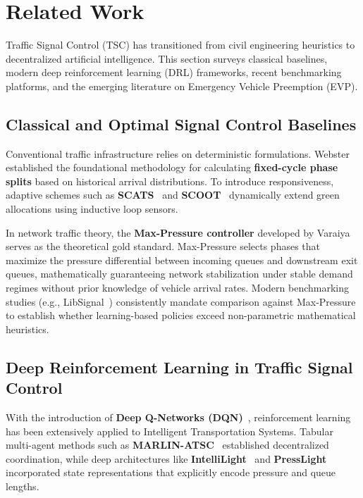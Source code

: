 \section{Related Work}
\label{sec:related_work}

Traffic Signal Control (TSC) has transitioned from civil engineering heuristics to decentralized artificial intelligence. This section surveys classical baselines, modern deep reinforcement learning (DRL) frameworks, recent benchmarking platforms, and the emerging literature on Emergency Vehicle Preemption (EVP).

\subsection{Classical and Optimal Signal Control Baselines}
Conventional traffic infrastructure relies on deterministic formulations. Webster~\cite{webster1958} established the foundational methodology for calculating \textbf{fixed-cycle phase splits} based on historical arrival distributions. To introduce responsiveness, adaptive schemes such as \textbf{SCATS}~\cite{lowrie1990scats} and \textbf{SCOOT}~\cite{hunt1981scoot} dynamically extend green allocations using inductive loop sensors.

In network traffic theory, the \textbf{Max-Pressure controller} developed by Varaiya~\cite{varaiya2013maxpressure} serves as the theoretical gold standard. Max-Pressure selects phases that maximize the pressure differential between incoming queues and downstream exit queues, mathematically guaranteeing network stabilization under stable demand regimes without prior knowledge of vehicle arrival rates. Modern benchmarking studies (e.g., LibSignal~\cite{mei2022libsignal}) consistently mandate comparison against Max-Pressure to establish whether learning-based policies exceed non-parametric mathematical heuristics.

\subsection{Deep Reinforcement Learning in Traffic Signal Control}
With the introduction of \textbf{Deep Q-Networks (DQN)}~\cite{mnih2015human}, reinforcement learning has been extensively applied to Intelligent Transportation Systems. Tabular multi-agent methods such as \textbf{MARLIN-ATSC}~\cite{eltantawy2013marlin} established decentralized coordination, while deep architectures like \textbf{IntelliLight}~\cite{wei2018intellilight} and \textbf{PressLight}~\cite{wei2019presslight} incorporated state representations that explicitly encode pressure and queue lengths.

